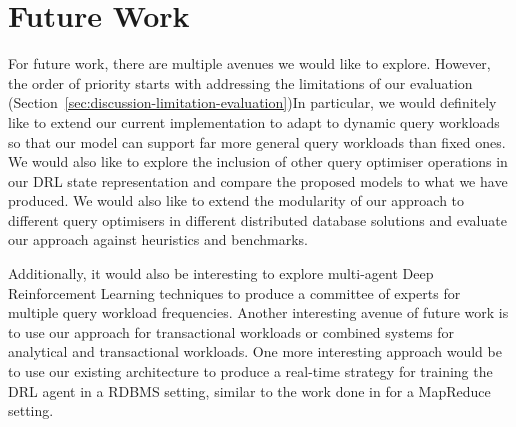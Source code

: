 \section{Future Work}
\label{sec:FutureWork}
For future work, there are multiple avenues we would like to explore. However, the order of priority starts with addressing the limitations of our evaluation (Section~\ref{sec:discussion-limitation-evaluation})In particular, we would definitely like to extend our current implementation to adapt to dynamic query workloads so that our model can support far more general query workloads than fixed ones. We would also like to explore the inclusion of other query optimiser operations in our DRL state representation and compare the proposed models to what we have produced.  We would also like to extend the modularity of our approach to different query optimisers in different distributed database solutions and evaluate our approach against heuristics and benchmarks. 



Additionally, it would also be interesting to explore multi-agent Deep Reinforcement Learning techniques to produce a committee of experts for multiple query workload frequencies. Another interesting avenue of future work is to use our approach for transactional workloads or combined systems for analytical and transactional workloads. One more interesting approach would be to use our existing architecture to produce a real-time strategy for training the DRL agent in a RDBMS setting, similar to the work done in \cite{DBLP:conf/sigmod/AbdelhamidA20} for a MapReduce setting.

